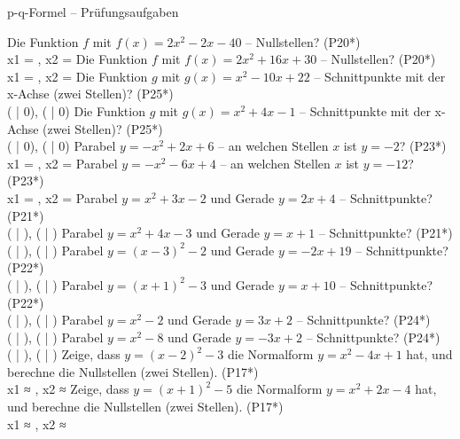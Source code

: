 \begin{aufgabe}{p-q-Formel – Prüfungsaufgaben}
\begin{teile}
\steil Die Funktion $f$ mit $f(x) = 2x^2 - 2x - 40$ – Nullstellen? \hfill (P20*) \\ x1 = \leerfeld , x2 = \leerfeld
\steil Die Funktion $f$ mit $f(x) = 2x^2 + 16x + 30$ – Nullstellen? \hfill (P20*) \\ x1 = \leerfeld , x2 = \leerfeld
\steil Die Funktion $g$ mit $g(x) = x^2 - 10x + 22$ – Schnittpunkte mit der x-Achse (zwei Stellen)? \hfill (P25*) \\ ( \leerfeld | 0), ( \leerfeld | 0)
\steil Die Funktion $g$ mit $g(x) = x^2 + 4x - 1$ – Schnittpunkte mit der x-Achse (zwei Stellen)? \hfill (P25*) \\ ( \leerfeld | 0), ( \leerfeld | 0)
\steil Parabel $y = -x^2 + 2x + 6$ – an welchen Stellen $x$ ist $y = -2$? \hfill (P23*) \\ x1 = \leerfeld , x2 = \leerfeld
\steil Parabel $y = -x^2 - 6x + 4$ – an welchen Stellen $x$ ist $y = -12$? \hfill (P23*) \\ x1 = \leerfeld , x2 = \leerfeld
\steil Parabel $y = x^2 + 3x - 2$ und Gerade $y = 2x + 4$ – Schnittpunkte? \hfill (P21*) \\ ( \leerfeld | \leerfeld ), ( \leerfeld | \leerfeld )
\steil Parabel $y = x^2 + 4x - 3$ und Gerade $y = x + 1$ – Schnittpunkte? \hfill (P21*) \\ ( \leerfeld | \leerfeld ), ( \leerfeld | \leerfeld )
\steil Parabel $y = (x - 3)^2 - 2$ und Gerade $y = -2x + 19$ – Schnittpunkte? \hfill (P22*) \\ ( \leerfeld | \leerfeld ), ( \leerfeld | \leerfeld )
\steil Parabel $y = (x + 1)^2 - 3$ und Gerade $y = x + 10$ – Schnittpunkte? \hfill (P22*) \\ ( \leerfeld | \leerfeld ), ( \leerfeld | \leerfeld )
\steil Parabel $y = x^2 - 2$ und Gerade $y = 3x + 2$ – Schnittpunkte? \hfill (P24*) \\ ( \leerfeld | \leerfeld ), ( \leerfeld | \leerfeld )
\steil Parabel $y = x^2 - 8$ und Gerade $y = -3x + 2$ – Schnittpunkte? \hfill (P24*) \\ ( \leerfeld | \leerfeld ), ( \leerfeld | \leerfeld )
\steil Zeige, dass $y = (x - 2)^2 - 3$ die Normalform $y = x^2 - 4x + 1$ hat, und berechne die Nullstellen (zwei Stellen). \hfill (P17*) \\ x1 ≈ \leerfeld , x2 ≈ \leerfeld
\steil Zeige, dass $y = (x + 1)^2 - 5$ die Normalform $y = x^2 + 2x - 4$ hat, und berechne die Nullstellen (zwei Stellen). \hfill (P17*) \\ x1 ≈ \leerfeld , x2 ≈ \leerfeld
\end{teile}
\end{aufgabe}

